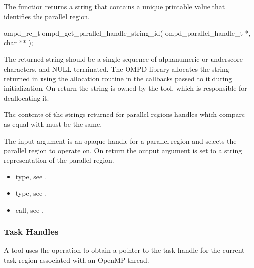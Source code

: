 \label{subsubsubsec:ompd_get_parallel_handle_string_id}
\summary
The  function returns a string that contains a unique
printable value that identifies the parallel region.

\format

\begin{cspecific}
\begin{ompSyntax}
ompd_rc_t ompd_get_parallel_handle_string_id(
  ompd_parallel_handle_t *,
  char **
);
\end{ompSyntax}
\end{cspecific}


\descr
The returned string should be a single sequence of alphanumeric or underscore characters, and
NULL terminated. The OMPD library allocates the string returned in 
using the allocation routine in the callbacks passed to it during initialization. On return the string is
owned by the tool, which is responsible for deallocating it.

The contents of the strings returned for parallel regions handles which compare as equal with
 must be the same.

\argdesc
The input argument  is an opaque handle for a parallel region and selects the parallel region to operate on.
On return the output argument  is set to a string representation of the parallel region.

\crossreferences
\begin{itemize}
  \item {} type, see .
	\item {} type, see .
	\item {} call, see .
\end{itemize}


\subsubsection{Task Handles}

\label{subsubsubsec:ompd_get_current_task_handle}
\summary
A tool uses the  operation to obtain a pointer to the
task handle for the current task region associated with an OpenMP thread.

